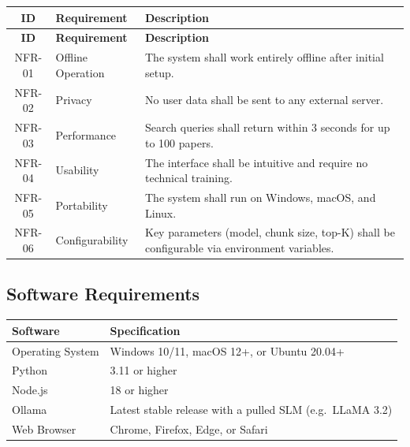 \documentclass[12pt,a4paper]{article}
\begin{document}
\begin{longtable}{|c|p{3.5cm}|p{8cm}|}
    \hline
    \textbf{ID} & \textbf{Requirement} & \textbf{Description} \\ \hline
    \endfirsthead
    \hline
    \textbf{ID} & \textbf{Requirement} & \textbf{Description} \\ \hline
    \endhead
    \hline
    \endfoot

    NFR-01 & Offline Operation &
    The system shall work entirely offline after initial setup. \\ \hline

    NFR-02 & Privacy &
    No user data shall be sent to any external server. \\ \hline

    NFR-03 & Performance &
    Search queries shall return within 3 seconds for up to 100
    papers. \\ \hline

    NFR-04 & Usability &
    The interface shall be intuitive and require no technical
    training. \\ \hline

    NFR-05 & Portability &
    The system shall run on Windows, macOS, and Linux. \\ \hline

    NFR-06 & Configurability &
    Key parameters (model, chunk size, top-K) shall be configurable
    via environment variables. \\ \hline
\end{longtable}

\subsection{Software Requirements}

\begin{center}
\begin{tabularx}{\textwidth}{|l|X|}
    \hline
    \textbf{Software} & \textbf{Specification} \\ \hline
    Operating System & Windows 10/11, macOS 12+, or Ubuntu 20.04+ \\ \hline
    Python & 3.11 or higher \\ \hline
    Node.js & 18 or higher \\ \hline
    Ollama & Latest stable release with a pulled SLM (e.g.\ LLaMA 3.2) \\ \hline
    Web Browser & Chrome, Firefox, Edge, or Safari \\ \hline
\end{tabularx}
\end{center}
\end{document}
